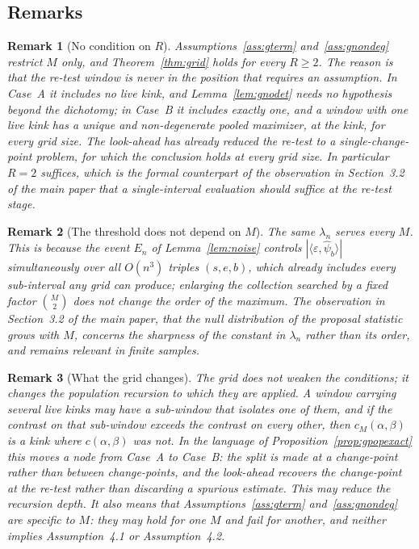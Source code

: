\documentclass[12pt, a4paper]{article}
\newtheorem{remark}{Remark}[section]
\newcommand{\assterm}{Assumption~4.1}
\newcommand{\assnondeg}{Assumption~4.2}
\begin{document}
\subsection{Remarks}
\label{sup:gridremarks}

\begin{remark}[No condition on $R$]
\label{rem:noR}
Assumptions~\ref{ass:gterm} and~\ref{ass:gnondeg} restrict $M$ only, and
Theorem~\ref{thm:grid} holds for every $R \ge 2$. The reason is that the
re-test window is never in the position that requires an assumption. In Case~A
it includes no live kink, and Lemma~\ref{lem:gnodet} needs no hypothesis beyond
the dichotomy; in Case~B it includes exactly one, and a window with one live kink has a unique and non-degenerate pooled maximizer, at the kink, for every grid size. The look-ahead has already reduced the re-test to a single-change-point problem, for which the conclusion holds at every grid size. In particular $R = 2$ suffices, which is the formal counterpart
of the observation in Section~3.2 of the main paper that a single-interval
evaluation should suffice at the re-test stage.
\end{remark}

\begin{remark}[The threshold does not depend on $M$]
\label{rem:thresholdM}
The same $\lambda_n$ serves every $M$. This is because the event $E_n$ of
Lemma~\ref{lem:noise} controls $|\langle\varepsilon,\hat\psi_b\rangle|$
simultaneously over all $O(n^3)$ triples $(s,e,b)$, which already includes
every sub-interval any grid can produce; enlarging the collection searched by a
fixed factor $\binom{M}{2}$ does not change the order of the maximum. The
observation in Section~3.2 of the main paper, that the null distribution of the
proposal statistic grows with $M$, concerns the sharpness of the constant in
$\lambda_n$ rather than its order, and remains relevant in finite samples.
\end{remark}

\begin{remark}[What the grid changes]
\label{rem:gridchanges}
The grid does not weaken the conditions; it changes the population recursion to
which they are applied. A window carrying several live kinks may have a
sub-window that isolates one of them, and if the contrast on that sub-window
exceeds the contrast on every other, then $c_M(\alpha,\beta)$ is a kink where
$c(\alpha,\beta)$ was not. In the language of
Proposition~\ref{prop:gpopexact} this moves a node from Case~A to Case~B: the
split is made at a change-point rather than between change-points, and the
look-ahead recovers the change-point at the re-test rather than discarding a
spurious estimate. This may reduce the recursion depth. It also means that
Assumptions~\ref{ass:gterm} and~\ref{ass:gnondeg} are specific to $M$:
they may hold for one $M$ and fail for another, and neither implies
\assterm{} or \assnondeg{}.
\end{remark}
\end{document}
